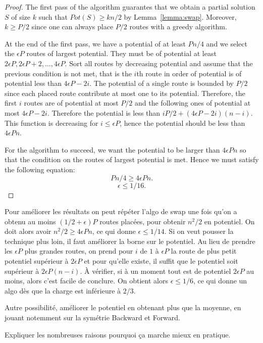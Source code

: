 \documentclass[10pt, conference, letterpaper]{IEEEtran}
\begin{document}
\begin{proof}
 The first pass of the algorithm guarantes that we obtain a partial solution 
 $S$ of size $k$ such that $Pot(S) \geq kn/2$ by Lemma~\ref{lemma:swap}. 
 Moreover, $k \geq P/2$ since one can always place $P/2$ routes with a greedy algorithm.
 
At the end of the first pass, we have a potential of at least $Pn/4$ and we select the $\epsilon P$ routes of largest potential. They must be of potential at least $2\epsilon P, 2\epsilon P +2,\dots ,4\epsilon P$.
Sort all routes by decreasing potential and assume that the previous condition is not met, that is the $i$th route in order of potential is of potential less than $4\epsilon P - 2i$. The potential of a single route is bounded by $P/2$ since each placed route contribute at most one to its potential. Therefore, the first
$i$ routes are of potential at most $P/2$ and the following ones of potential at most $4\epsilon P - 2i$. Therefore the potential is less than $iP/2 + (4\epsilon P - 2i) (n -i)$. This function is decreasing for $i \leq \epsilon P$, hence the potential should be less than $4\epsilon P n$.
 
 For the algorithm to succeed, we want the potential to be larger than $4\epsilon P n$ so that the condition on the routes of largest potential is met.
Hence we must satisfy the following equation:
 $$Pn/4 \geq 4\epsilon P n.$$
 $$ \epsilon \leq 1/16.$$
\end{proof}


Pour améliorer les résultats on peut répéter l'algo de swap une fois qu'on a obtenu 
au moins $(1/2 + \epsilon)P$ routes placées, pour obtenir $n^2/2$ en potentiel. 
On doit alors avoir $n^2/2 \geq 4\epsilon P n$, ce qui donne $\epsilon \leq 1/14$.
Si on veut pousser la technique plus loin, il faut améliorer la borne sur le potentiel.
Au lieu de prendre les $\epsilon P$ plus grandes routes, on prend pour $i$ de $1$
à $\epsilon P$ la route de plus petit potentiel supérieur à $2 \epsilon P$ et 
pour qu'elle existe, il suffit que le potentiel soit supérieur à $2\epsilon P (n -i)$.
À vérifier, si à un moment tout est de potentiel $2 \epsilon P$ au moins, alors 
c'est facile de conclure. On obtient alors $\epsilon \leq 1/6$, ce qui donne un algo
dès que la charge est inférieure à $2/3$.

Autre possibilité, améliorer le potentiel en obtenant plus que la moyenne, en jouant notemment sur la symétrie Backward et Forward.

Expliquer les nombreuses raisons pourquoi ça marche mieux en pratique.
\end{document}
